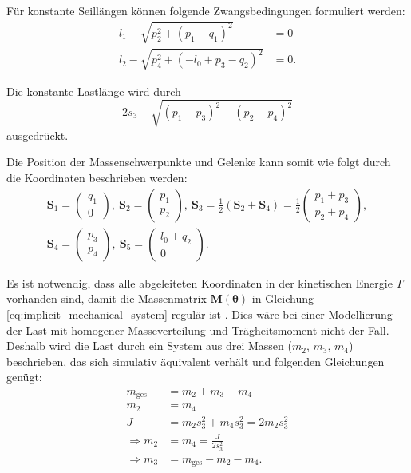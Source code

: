 Für konstante Seillängen können folgende Zwangsbedingungen formuliert werden:
\begin{align}
	l_{1} - \sqrt{p_{2}^{2} + \left(p_{1} - q_{1}\right)^{2}} &= 0\\
	l_{2} - \sqrt{p_{4}^{2} + \left(- l_{0} + p_{3} - q_{2}\right)^{2}} &= 0.	
\end{align}

Die konstante Lastlänge wird durch
\begin{equation}
	2 s_{3} - \sqrt{\left(p_{1} - p_{3}\right)^{2} + \left(p_{2} - p_{4}\right)^{2}}
\end{equation}
ausgedrückt.

Die Position der Massenschwerpunkte und Gelenke kann somit wie folgt durch die Koordinaten beschrieben werden:
\begin{align}
	\mathbf{S}_1 =
	\begin{pmatrix}
		q_1 \\
		0
	\end{pmatrix}, 
	\
	\mathbf{S}_2 =
	\begin{pmatrix}
		p_1 \\
		p_2
	\end{pmatrix},
	\
	\mathbf{S}_3 =
	\frac{1}{2}(\mathbf{S}_2 + \mathbf{S}_4) =
	\frac{1}{2}
	\begin{pmatrix}
		p_1 + p_3 \\
		p_2 + p_4
	\end{pmatrix},
	\nonumber \\
	\mathbf{S}_4 =
	\left(\begin{matrix}
		p_3 \\
		p_4
	\end{matrix}\right),
	\
	\mathbf{S}_5 =
	\left(\begin{matrix}
		l_0 + q_2 \\
		0
	\end{matrix}\right).
\end{align}

Es ist notwendig, dass alle abgeleiteten Koordinaten in der kinetischen Energie $T$ vorhanden sind, damit die Massenmatrix $\mathbf{M}(\mathbf{\theta})$ in Gleichung \eqref{eq:implicit_mechanical_system} regulär ist \cite[S. 7]{DissKnoll}. Dies wäre bei einer Modellierung der Last mit homogener Masseverteilung und Trägheitsmoment nicht der Fall. Deshalb wird die Last durch ein System aus drei Massen ($m_2$, $m_3$, $m_4$) beschrieben, das sich simulativ äquivalent verhält und folgenden Gleichungen genügt:
\begin{align}
	m_{\mathrm{ges}} &= m_2 + m_3 + m_4\\
	m_2 &= m_4\\
	J &= m_2 s_3^2 + m_4 s_3^2 = 2 m_2 s_3^2\\
	\Rightarrow m_2 &= m_4 = \frac{J}{2 s_3^2} \\
	\Rightarrow m_3 &= m_{\mathrm{ges}} - m_2 -m_4.
\end{align}

